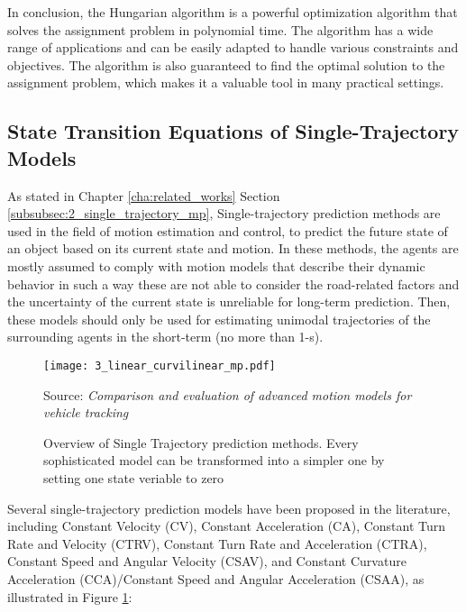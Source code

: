 In conclusion, the Hungarian algorithm is a powerful optimization algorithm that solves the assignment problem in polynomial time. The algorithm has a wide range of applications and can be easily adapted to handle various constraints and objectives. The algorithm is also guaranteed to find the optimal solution to the assignment problem, which makes it a valuable tool in many practical settings.
	
\subsection{State Transition Equations of Single-Trajectory Models}
\label{subsec:3_state_transitions_single_traj}

As stated in Chapter \ref{cha:related_works} Section \ref{subsubsec:2_single_trajectory_mp}, Single-trajectory prediction methods are used in the field of motion estimation and control, to predict the future state of an object based on its current state and motion. In these methods, the agents are mostly assumed to comply with motion models that describe their dynamic behavior in such a way these are not able to consider the road-related factors and the uncertainty of the current state is unreliable for long-term prediction. Then, these models should only be used for estimating unimodal trajectories of the surrounding agents in the short-term (no more than 1-s).

\begin{figure}[h]
	\centering
	\texttt{[image: 3\_linear\_curvilinear\_mp.pdf]}
	\caption[Overview of Single Trajectory prediction methods]{Overview of Single Trajectory prediction methods. Every sophisticated model can be transformed into a simpler one by setting one state veriable to zero}
	Source: \textit{Comparison and evaluation of advanced motion models for vehicle tracking} \cite{schubert2008comparison}
	\label{fig:3_linear_curvilinear_mp}
\end{figure}

Several single-trajectory prediction models have been proposed in the literature, including Constant Velocity (CV), Constant Acceleration (CA), Constant Turn Rate and Velocity (CTRV), Constant Turn Rate and Acceleration (CTRA), Constant Speed and Angular Velocity (CSAV), and Constant Curvature Acceleration (CCA)/Constant Speed and Angular Acceleration (CSAA), as illustrated in Figure \ref{fig:3_linear_curvilinear_mp}:

